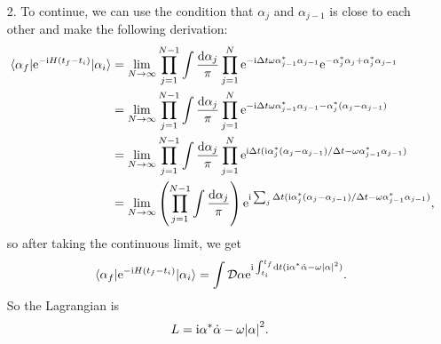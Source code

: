 \documentclass[hyperref, a4paper]{article}
\newcommand*{\ii}{\mathrm{i}}
\newcommand*{\ee}{\mathrm{e}}
\begin{document}
\begin{itemize}
\item[2.] To continue, we can use the condition that $\alpha_j$ and $\alpha_{j-1}$ is close to each other 
and make the following derivation: 
\[
    \begin{aligned}
        \mel{\alpha_f}{\ee^{- \ii H(t_f - t_i)}}{\alpha_i} 
        &= \lim_{N \to \infty} \prod_{j=1}^{N-1} \int \frac{\dd{\alpha_j}}{\pi} \prod_{j=1}^N 
        \ee^{- \ii \Delta t \omega \alpha_{j-1}^* \alpha_{j-1}}
        \ee^{- \alpha^*_j \alpha_j + \alpha_j^* \alpha_{j-1}} \\ 
        &= \lim_{N \to \infty} \prod_{j=1}^{N-1} \int \frac{\dd{\alpha_j}}{\pi} \prod_{j=1}^N 
        \ee^{- \ii \Delta t \omega \alpha_{j-1}^* \alpha_{j-1} - \alpha_j^* (\alpha_j - \alpha_{j-1})} \\
        &= \lim_{N \to \infty} \prod_{j=1}^{N-1} \int \frac{\dd{\alpha_j}}{\pi} \prod_{j=1}^N 
        \ee^{\ii \Delta t (\ii \alpha_j^* (\alpha_j - \alpha_{j-1}) / \Delta t - \omega \alpha_{j-1}^* \alpha_{j-1}) } \\
        &= \lim_{N \to \infty} \left( \prod_{j=1}^{N-1} \int \frac{\dd{\alpha_j}}{\pi} \right)
        \ee^{\ii \sum_j \Delta t (\ii \alpha_j^* (\alpha_j - \alpha_{j-1}) / \Delta t - \omega \alpha_{j-1}^* \alpha_{j-1}) },
    \end{aligned}
\]
so after taking the continuous limit, we get 
\begin{equation}
    \mel{\alpha_f}{\ee^{- \ii H (t_f - t_i)}}{\alpha_i} = \int \mathcal{D} \alpha 
    \ee^{\ii \int_{t_i}^{t_f} \dd{t} (\ii \alpha^* \dot{\alpha} - \omega \abs{\alpha}^2 )}.
\end{equation}
So the Lagrangian is 
\begin{equation}
    L = \ii \alpha^* \dot{\alpha} - \omega \abs{\alpha}^2.
    \label{eq:lagrangian-oscillator}
\end{equation}


\end{itemize}
\end{document}
